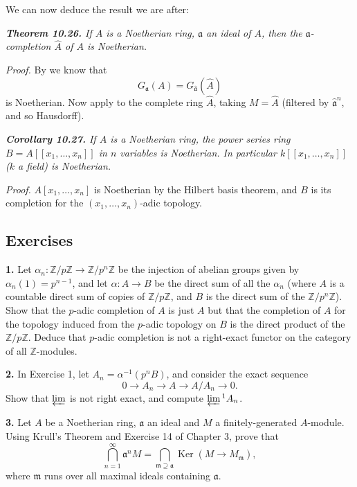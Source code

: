 We can now deduce the result we are after:

\medskip
\noindent\textit{\textbf{Theorem 10.26.} If $A$ is a Noetherian ring, $\mathfrak a$ an ideal of $A$, then the $\mathfrak a$-completion $\widehat A$ of $A$ is Noetherian.}

\noindent\emph{Proof.}  By  we know that
\[
G_\mathfrak a(A)=G_{\widehat{\mathfrak a}}(\widehat A)
\]
is Noetherian.  Now apply  to the complete ring $\widehat A$, taking $M=\widehat A$
(filtered by $\widehat{\mathfrak a}^n$, and so Hausdorff).\proofbox

\medskip
\noindent\textit{\textbf{Corollary 10.27.} If $A$ is a Noetherian ring, the power series ring $B=
A[[x_1,\ldots,x_n]]$ in $n$ variables is Noetherian.  In particular $k[[x_1,\ldots,x_n]]$
($k$ a field) is Noetherian.}

\noindent\emph{Proof.}  $A[x_1,\ldots,x_n]$ is Noetherian by the Hilbert basis theorem, and $B$ is its
completion for the $(x_1,\ldots,x_n)$-adic topology.\proofbox

\subsection{Exercises}

\noindent\textbf{1.} Let $\alpha_n:\mathbb Z/p\mathbb Z\longrightarrow\mathbb Z/p^n\mathbb Z$ be the injection of abelian groups given by $\alpha_n(1)=p^{n-1}$,
and let $\alpha:A\longrightarrow B$ be the direct sum of all the $\alpha_n$ (where $A$ is a countable direct
sum of copies of $\mathbb Z/p\mathbb Z$, and $B$ is the direct sum of the $\mathbb Z/p^n\mathbb Z$).  Show that the
$p$-adic completion of $A$ is just $A$ but that the completion of $A$ for the topology
induced from the $p$-adic topology on $B$ is the direct product of the $\mathbb Z/p\mathbb Z$.  Deduce
that $p$-adic completion is not a right-exact functor on the category of all $\mathbb Z$-modules.

\medskip
\noindent\textbf{2.} In Exercise 1, let $A_n=\alpha^{-1}(p^nB)$, and consider the exact sequence
\[
0\longrightarrow A_n\longrightarrow A\longrightarrow A/A_n\longrightarrow0.
\]
Show that $\varprojlim$ is not right exact, and compute $\varprojlim{}^1A_n$.

\medskip
\noindent\textbf{3.} Let $A$ be a Noetherian ring, $\mathfrak a$ an ideal and $M$ a finitely-generated $A$-module.
Using Krull's Theorem and Exercise 14 of Chapter 3, prove that
\[
\bigcap_{n=1}^\infty\mathfrak a^nM=\bigcap_{\mathfrak m\supseteq\mathfrak a}\operatorname{Ker}(M\longrightarrow M_\mathfrak m),
\]
where $\mathfrak m$ runs over all maximal ideals containing $\mathfrak a$.

